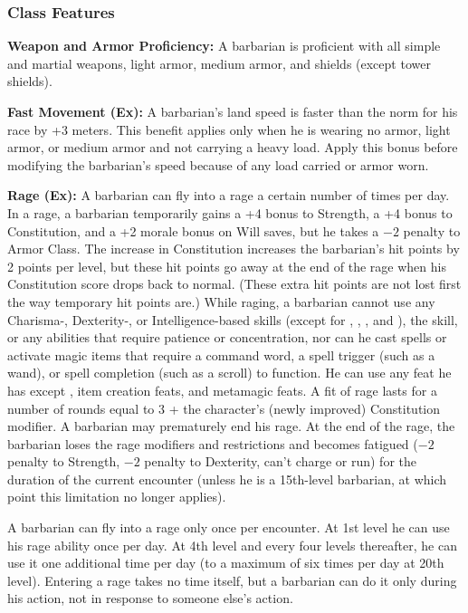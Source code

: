 \subsubsection{Class Features}
\textbf{Weapon and Armor Proficiency:} A barbarian is proficient with all simple and martial weapons, light armor, medium armor, and shields (except tower shields).

\textbf{Fast Movement (Ex):} A barbarian's land speed is faster than the norm for his race by +3 meters. This benefit applies only when he is wearing no armor, light armor, or medium armor and not carrying a heavy load. Apply this bonus before modifying the barbarian's speed because of any load carried or armor worn.

\textbf{Rage (Ex):} A barbarian can fly into a rage a certain number of times per day. In a rage, a barbarian temporarily gains a +4 bonus to Strength, a +4 bonus to Constitution, and a +2 morale bonus on Will saves, but he takes a $-2$ penalty to Armor Class. The increase in Constitution increases the barbarian's hit points by 2 points per level, but these hit points go away at the end of the rage when his Constitution  score drops back to normal. (These extra hit points are not lost first the way temporary hit points are.) While raging, a barbarian cannot use any Charisma-, Dexterity-, or Intelligence-based skills (except for , , , and ), the  skill, or any abilities that require patience or concentration, nor can he cast spells or activate magic items that require a command word, a spell trigger (such as a wand), or spell completion (such as a scroll) to function. He can use any feat he has except , item creation feats, and metamagic feats. A fit of rage lasts for a number of rounds equal to 3 + the character's (newly improved) Constitution modifier. A barbarian may prematurely end his rage. At the end of the rage, the barbarian loses the rage modifiers and restrictions and becomes fatigued ($-2$ penalty to Strength, $-2$ penalty to Dexterity, can't charge or run) for the duration of the current encounter (unless he is a 15th-level barbarian, at which point this limitation no longer applies).

A barbarian can fly into a rage only once per encounter. At 1st level he can use his rage ability once per day. At 4th level and every four levels thereafter, he can use it one additional time per day (to a maximum of six times per day at 20th level). Entering a rage takes no time itself, but a barbarian can do it only during his action, not in response to someone else's action. 

